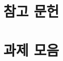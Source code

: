 \documentclass[a4paper,11pt]{article}
\begin{document}
\section*{참고 문헌}

% 
% 

\appendix

\section{과제 모음}
\label{app:task-suite}
\end{document}
